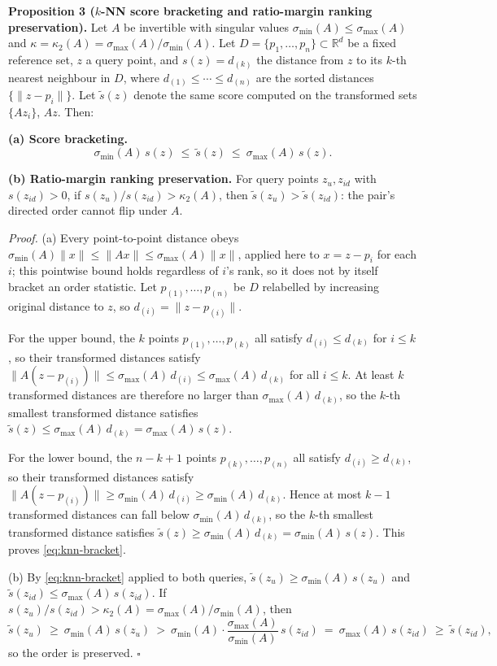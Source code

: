 \documentclass[pdflatex,sn-basic]{sn-jnl}
\theoremstyle{plain}
\theoremstyle{definition}
\theoremstyle{remark}
\begin{document}
\textbf{Proposition 3 ($k$-NN score bracketing and ratio-margin ranking preservation).} Let $A$ be invertible with singular values $\sigma_{\min}(A)\le\sigma_{\max}(A)$ and $\kappa=\kappa_2(A)=\sigma_{\max}(A)/\sigma_{\min}(A)$. Let $D=\{p_1,\ldots,p_n\}\subset\mathbb{R}^d$ be a fixed reference set, $z$ a query point, and $s(z)=d_{(k)}$ the distance from $z$ to its $k$-th nearest neighbour in $D$, where $d_{(1)}\le\cdots\le d_{(n)}$ are the sorted distances $\{\|z-p_i\|\}$. Let $\widetilde s(z)$ denote the same score computed on the transformed sets $\{Az_i\}$, $Az$. Then:

\textbf{(a) Score bracketing.}
\begin{equation}
\sigma_{\min}(A)\,s(z)\ \le\ \widetilde s(z)\ \le\ \sigma_{\max}(A)\,s(z).
\label{eq:knn-bracket}
\end{equation}

\textbf{(b) Ratio-margin ranking preservation.} For query points $z_u,z_{id}$ with $s(z_{id})>0$, if $s(z_u)/s(z_{id})>\kappa_2(A)$, then $\widetilde s(z_u)>\widetilde s(z_{id})$: the pair's directed order cannot flip under $A$.

\emph{Proof.} (a) Every point-to-point distance obeys $\sigma_{\min}(A)\|x\|\le\|Ax\|\le\sigma_{\max}(A)\|x\|$, applied here to $x=z-p_i$ for each $i$; this pointwise bound holds regardless of $i$'s rank, so it does not by itself bracket an order statistic. Let $p_{(1)},\ldots,p_{(n)}$ be $D$ relabelled by increasing original distance to $z$, so $d_{(i)}=\|z-p_{(i)}\|$.

For the upper bound, the $k$ points $p_{(1)},\ldots,p_{(k)}$ all satisfy $d_{(i)}\le d_{(k)}$ for $i\le k$, so their transformed distances satisfy $\|A(z-p_{(i)})\|\le\sigma_{\max}(A)\,d_{(i)}\le\sigma_{\max}(A)\,d_{(k)}$ for all $i\le k$. At least $k$ transformed distances are therefore no larger than $\sigma_{\max}(A)\,d_{(k)}$, so the $k$-th smallest transformed distance satisfies $\widetilde s(z)\le\sigma_{\max}(A)\,d_{(k)}=\sigma_{\max}(A)\,s(z)$.

For the lower bound, the $n-k+1$ points $p_{(k)},\ldots,p_{(n)}$ all satisfy $d_{(i)}\ge d_{(k)}$, so their transformed distances satisfy $\|A(z-p_{(i)})\|\ge\sigma_{\min}(A)\,d_{(i)}\ge\sigma_{\min}(A)\,d_{(k)}$. Hence at most $k-1$ transformed distances can fall below $\sigma_{\min}(A)\,d_{(k)}$, so the $k$-th smallest transformed distance satisfies $\widetilde s(z)\ge\sigma_{\min}(A)\,d_{(k)}=\sigma_{\min}(A)\,s(z)$. This proves \eqref{eq:knn-bracket}.

(b) By \eqref{eq:knn-bracket} applied to both queries, $\widetilde s(z_u)\ge\sigma_{\min}(A)\,s(z_u)$ and $\widetilde s(z_{id})\le\sigma_{\max}(A)\,s(z_{id})$. If $s(z_u)/s(z_{id})>\kappa_2(A)=\sigma_{\max}(A)/\sigma_{\min}(A)$, then
\[
\widetilde s(z_u)\ \ge\ \sigma_{\min}(A)\,s(z_u)\ >\ \sigma_{\min}(A)\cdot\frac{\sigma_{\max}(A)}{\sigma_{\min}(A)}\,s(z_{id})\ =\ \sigma_{\max}(A)\,s(z_{id})\ \ge\ \widetilde s(z_{id}),
\]
so the order is preserved. \hfill$\square$
\end{document}
